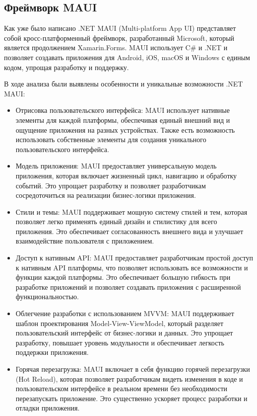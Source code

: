 \subsection{Фреймворк MAUI}
Как уже было написано .NET MAUI (Multi-platform App UI) представляет собой кросс-платформенный фреймворк, разработанный Microsoft, который является продолжением Xamarin.Forms. MAUI использует C\# и .NET и позволяет создавать приложения для Android, iOS, macOS и Windows с единым кодом, упрощая разработку и поддержку.

В ходе анализа были выявлены особенности и уникальные возможности .NET MAUI:
\begin{itemize}
\item Отрисовка пользовательского интерфейса: MAUI использует нативные элементы для каждой платформы, обеспечивая единый внешний вид и ощущение приложения на разных устройствах. Также есть возможность использовать собственные элементы для создания уникального пользовательского интерфейса.

\item Модель приложения: MAUI предоставляет универсальную модель приложения, которая включает жизненный цикл, навигацию и обработку событий. Это упрощает разработку и позволяет разработчикам сосредоточиться на реализации бизнес-логики приложения.

\item Стили и темы: MAUI поддерживает мощную систему стилей и тем, которая позволяет легко применять единый дизайн и стилистику для всего приложения. Это обеспечивает согласованность внешнего вида и улучшает взаимодействие пользователя с приложением.

\item Доступ к нативным API: MAUI предоставляет разработчикам простой доступ к нативным API платформы, что позволяет использовать все возможности и функции каждой платформы. Это обеспечивает большую гибкость при разработке приложений и позволяет создавать приложения с расширенной функциональностью.

\item Облегчение разработки с использованием MVVM: MAUI поддерживает шаблон проектирования Model-View-ViewModel, который разделяет пользовательский интерфейс от бизнес-логики и данных. Это упрощает разработку, повышает уровень модульности и обеспечивает легкость поддержки приложения.

\item Горячая перезагрузка: MAUI включает в себя функцию горячей перезагрузки (Hot Reload), которая позволяет разработчикам видеть изменения в коде и пользовательском интерфейсе в реальном времени без необходимости перезапускать приложение. Это существенно ускоряет процесс разработки и отладки приложения.


\end{itemize}
